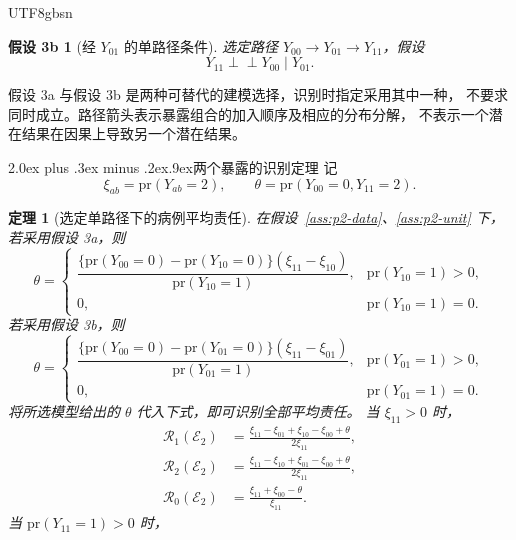 \documentclass[11pt,a4paper]{article}
\makeatletter
\newcommand{\headingweight}{\ifPDFTeX\mdseries\else\bfseries\fi}
\renewcommand{\section}{\@startsection{section}{1}{0pt}
  {2.0ex plus .3ex minus .2ex}{.9ex}{\normalfont\large\headingweight}}
\newcommand{\indep}{\mathrel{\perp\!\!\!\perp}}
\theoremstyle{report}
\newtheorem{theorem}{定理}
\newtheorem*{markovb}{假设 3b}
\newcommand{\pr}{\mathrm{pr}}
\makeatother
\begin{document}
\begin{CJK*}{UTF8}{gbsn}
\begin{markovb}[经 $Y_{01}$ 的单路径条件]
选定路径 $Y_{00}\longrightarrow Y_{01}\longrightarrow Y_{11}$，假设
\begin{equation}\label{eq:markov-b}
Y_{11}\indep Y_{00}\mid Y_{01}.
\end{equation}
\end{markovb}
假设 3a 与假设 3b 是两种可替代的建模选择，识别时指定采用其中一种，
不要求同时成立。路径箭头表示暴露组合的加入顺序及相应的分布分解，
不表示一个潜在结果在因果上导致另一个潜在结果。
\setcounter{assumption}{3}

\clearpage
\section{两个暴露的识别定理}
记
\[
\xi_{ab}=\pr(Y_{ab}=2),\qquad
\theta=\pr(Y_{00}=0,Y_{11}=2).
\]
\begin{theorem}[选定单路径下的病例平均责任]\label{thm:p2}
在假设~\ref{ass:p2-data}、\ref{ass:p2-unit} 下，若采用假设 3a，则
\begin{equation}\label{eq:theta-a}
\theta=
\begin{cases}
\dfrac{\{\pr(Y_{00}=0)-\pr(Y_{10}=0)\}(\xi_{11}-\xi_{10})}
      {\pr(Y_{10}=1)},&\pr(Y_{10}=1)>0,\\[8pt]
0,&\pr(Y_{10}=1)=0.
\end{cases}
\end{equation}
若采用假设 3b，则
\begin{equation}\label{eq:theta-b}
\theta=
\begin{cases}
\dfrac{\{\pr(Y_{00}=0)-\pr(Y_{01}=0)\}(\xi_{11}-\xi_{01})}
      {\pr(Y_{01}=1)},&\pr(Y_{01}=1)>0,\\[8pt]
0,&\pr(Y_{01}=1)=0.
\end{cases}
\end{equation}
将所选模型给出的 $\theta$ 代入下式，即可识别全部平均责任。
当 $\xi_{11}>0$ 时，
\begin{equation}\label{eq:p2-grade2}
\begin{aligned}
\mathcal R_1(\mathcal E_2)
 &=\frac{\xi_{11}-\xi_{01}+\xi_{10}-\xi_{00}+\theta}{2\xi_{11}},\\
\mathcal R_2(\mathcal E_2)
 &=\frac{\xi_{11}-\xi_{10}+\xi_{01}-\xi_{00}+\theta}{2\xi_{11}},\\
\mathcal R_0(\mathcal E_2)
 &=\frac{\xi_{11}+\xi_{00}-\theta}{\xi_{11}}.
\end{aligned}
\end{equation}
当 $\pr(Y_{11}=1)>0$ 时，
\begin{equation}\label{eq:p2-grade1}

\end{equation}
\end{theorem}
\end{CJK*}
\end{document}
